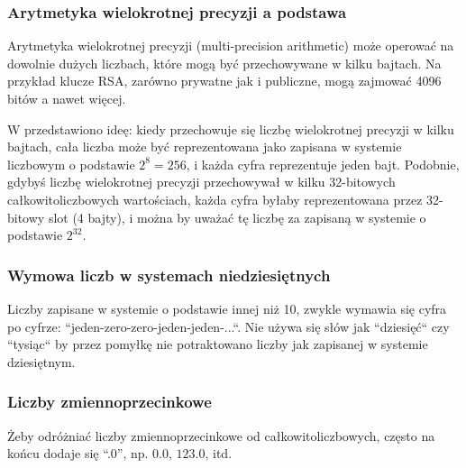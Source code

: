\subsubsection{Arytmetyka wielokrotnej precyzji a podstawa}

Arytmetyka wielokrotnej precyzji (multi-precision arithmetic) może operować na dowolnie dużych liczbach,
które mogą być przechowywane w kilku bajtach.
Na przykład klucze RSA, zarówno prywatne jak i publiczne, mogą zajmować 4096 bitów a nawet więcej.

W  przedstawiono ideę: kiedy przechowuje się liczbę wielokrotnej precyzji w kilku bajtach,
cała liczba może być reprezentowana jako zapisana w systemie liczbowym o podstawie $2^8=256$, i każda cyfra reprezentuje jeden bajt.
Podobnie, gdybyś liczbę wielokrotnej precyzji przechowywał w kilku 32-bitowych całkowitoliczbowych wartościach,
każda cyfra byłaby reprezentowana przez 32-bitowy slot (4 bajty), i można by uważać tę liczbę za zapisaną w systemie o podstawie $2^{32}$.

\subsubsection{Wymowa liczb w systemach niedziesiętnych}

Liczby zapisane w systemie o podstawie innej niż 10, zwykle wymawia się cyfra po cyfrze: ``jeden-zero-zero-jeden-jeden-...``. Nie używa się słów jak ``dziesięć`` czy ``tysiąc`` by przez pomyłkę nie potraktowano liczby jak zapisanej w systemie dziesiętnym.

\subsubsection{Liczby zmiennoprzecinkowe}

Żeby odróżniać liczby zmiennoprzecinkowe od całkowitoliczbowych, często na końcu dodaje się ``.0'',
np. $0.0$, $123.0$, itd.


